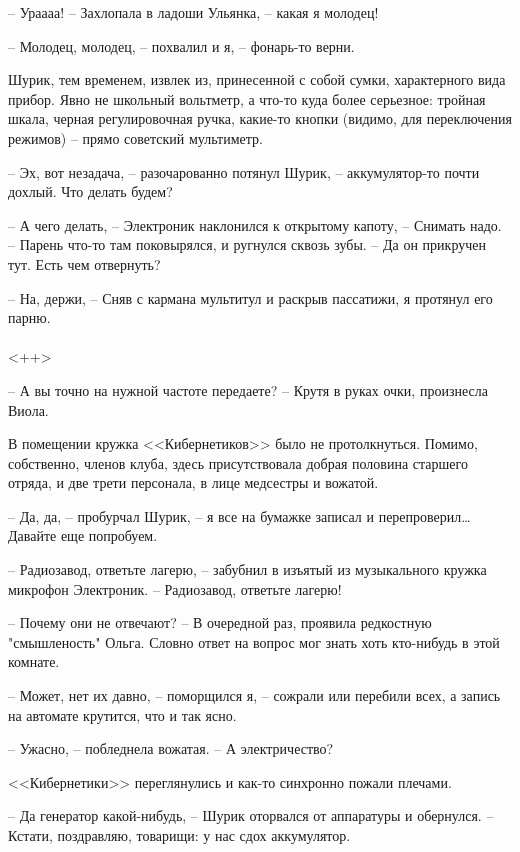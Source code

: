 \documentclass[a4paper]{book}
\begin{document}
-- Ураааа! -- Захлопала в ладоши Ульянка, -- какая я молодец! 

-- Молодец, молодец, -- похвалил и я, -- фонарь-то верни. 

Шурик, тем временем, извлек из, принесенной с собой сумки, характерного вида прибор. Явно не школьный вольтметр, а что-то куда более серьезное: тройная шкала, черная регулировочная ручка, какие-то кнопки (видимо, для переключения режимов) -- прямо советский мультиметр.

-- Эх, вот незадача, -- разочарованно потянул Шурик, -- аккумулятор-то почти дохлый. Что делать будем?

-- А чего делать, -- Электроник наклонился к открытому капоту, -- Снимать надо. -- Парень что-то там поковырялся, и ругнулся сквозь зубы. -- Да он прикручен тут. Есть чем отвернуть?

-- На, держи, -- Сняв с кармана мультитул и раскрыв пассатижи, я протянул его парню. 

\paragraph{}<++>

-- А вы точно на нужной частоте передаете? -- Крутя в руках очки, произнесла Виола.

В помещении кружка <<Кибернетиков>> было не протолкнуться. Помимо, собственно, членов клуба, здесь присутствовала добрая половина старшего отряда, и две трети персонала, в лице медсестры и вожатой.

-- Да, да, -- пробурчал Шурик, -- я все на бумажке записал и перепроверил\ldots Давайте еще попробуем. 

-- Радиозавод, ответьте лагерю, -- забубнил в изъятый из музыкального кружка микрофон Электроник. -- Радиозавод, ответьте лагерю! 

-- Почему они не отвечают? -- В очередной раз, проявила редкостную "смышленость" Ольга. Словно ответ на вопрос мог знать хоть кто-нибудь в этой комнате. 

-- Может, нет их давно, -- поморщился я, -- сожрали или перебили всех, а запись на автомате крутится, что и так ясно.

-- Ужасно, -- побледнела вожатая. -- А электричество?

<<Кибернетики>> переглянулись и как-то синхронно пожали плечами.

-- Да генератор какой-нибудь, -- Шурик оторвался от аппаратуры и обернулся. -- Кстати, поздравляю, товарищи: у нас сдох аккумулятор.
\end{document}
